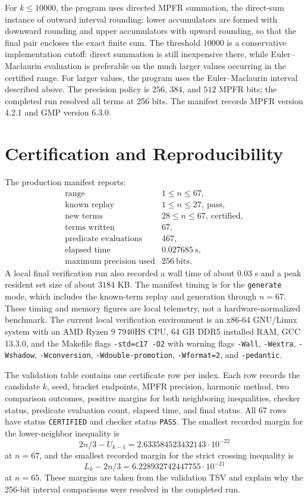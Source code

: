 \documentclass[11pt]{article}
\theoremstyle{definition}
\theoremstyle{remark}
\begin{document}
For \(k\leq 10000\), the program uses directed MPFR summation, the direct-sum
instance of outward interval rounding: lower
accumulators are formed with downward rounding and upper accumulators with
upward rounding, so that the final pair encloses the exact finite sum.  The
threshold \(10000\) is a conservative implementation cutoff: direct summation
is still inexpensive there, while Euler--Maclaurin evaluation is preferable on
the much larger values occurring in the certified range.  For larger values,
the program uses the Euler--Maclaurin interval described above.  The precision
policy is \(256\), \(384\), and \(512\) MPFR bits; the completed run resolved
all terms at 256 bits.  The manifest records MPFR version 4.2.1 and GMP
version 6.3.0.

\section{Certification and Reproducibility}

The production manifest  reports:
\[
\begin{array}{ll}
\text{range} & 1\leq n\leq 67,\\
\text{known replay} & 1\leq n\leq 27,\ \text{pass},\\
\text{new terms} & 28\leq n\leq 67,\ \text{certified},\\
\text{terms written} & 67,\\
\text{predicate evaluations} & 467,\\
\text{elapsed time} & 0.027685\ \text{s},\\
\text{maximum precision used} & 256\ \text{bits}.
\end{array}
\]
A local final verification run also recorded a wall time of about \(0.03\) s and a
peak resident set size of about \(3184\) KB.  The manifest timing is for the
\texttt{generate} mode, which includes the known-term replay and generation
through \(n=67\).  These timing and memory figures are local telemetry, not a
hardware-normalized benchmark.  The current local verification environment is
an x86-64 GNU/Linux system with an AMD Ryzen 9 7940HS CPU, 64 GB DDR5
installed RAM, GCC 13.3.0, and the Makefile flags
\texttt{-std=c17 -O2} with warning flags
\texttt{-Wall}, \texttt{-Wextra}, \texttt{-Wshadow}, \texttt{-Wconversion},
\texttt{-Wdouble-promotion}, \texttt{-Wformat=2}, and \texttt{-pedantic}.

The validation table  contains one
certificate row per index.  Each row records the candidate \(k\), seed,
bracket endpoints, MPFR precision, harmonic method, two comparison outcomes,
positive margins for both neighboring inequalities, checker status, predicate
evaluation count, elapsed time, and final status.  All 67 rows have status
\texttt{CERTIFIED} and checker status \texttt{PASS}.  The smallest recorded
margin for the lower-neighbor inequality is
\[
  2n/3-U_{k-1}=2.633584523432143\cdot 10^{-22}
\]
at \(n=67\), and the smallest recorded margin for the strict crossing
inequality is
\[
  L_k-2n/3=6.228932742447755\cdot 10^{-21}
\]
at \(n=65\).  These margins are taken from the validation TSV and explain why
the 256-bit interval comparisons were resolved in the completed run.
\end{document}

